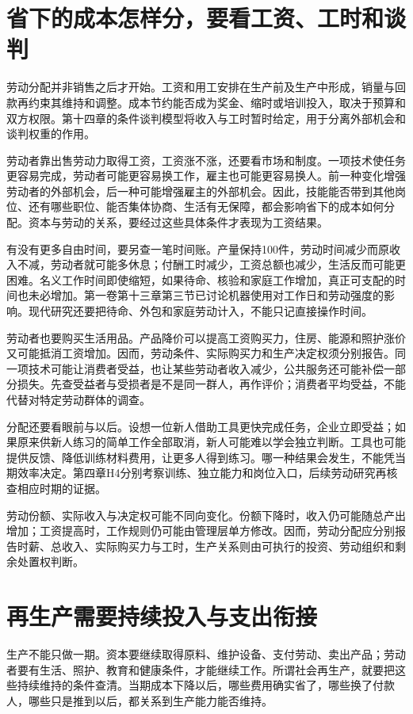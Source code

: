 \documentclass[UTF8,fontset=windows,12pt,a4paper,oneside,openany]{ctexbook}
\begin{document}
\section{省下的成本怎样分，要看工资、工时和谈判}

劳动分配并非销售之后才开始。工资和用工安排在生产前及生产中形成，销量与回款再约束其维持和调整。成本节约能否成为奖金、缩时或培训投入，取决于预算和双方权限。第十四章的条件谈判模型将收入与工时暂时给定，用于分离外部机会和谈判权重的作用。

劳动者靠出售劳动力取得工资，工资涨不涨，还要看市场和制度。一项技术使任务更容易完成，劳动者可能更容易换工作，雇主也可能更容易换人。前一种变化增强劳动者的外部机会，后一种可能增强雇主的外部机会。因此，技能能否带到其他岗位、还有哪些职位、能否集体协商、生活有无保障，都会影响省下的成本如何分配。资本与劳动的关系，要经过这些具体条件才表现为工资结果。

有没有更多自由时间，要另查一笔时间账。产量保持100件，劳动时间减少而原收入不减，劳动者就可能多休息；付酬工时减少，工资总额也减少，生活反而可能更困难。名义工作时间即使缩短，如果待命、核验和家庭工作增加，真正可支配的时间也未必增加。第一卷第十三章第三节已讨论机器使用对工作日和劳动强度的影响。现代研究还要把待命、外包和家庭劳动计入，不能只记直接操作时间。

劳动者也要购买生活用品。产品降价可以提高工资购买力，住房、能源和照护涨价又可能抵消工资增加。因而，劳动条件、实际购买力和生产决定权须分别报告。同一项技术可能让消费者受益，也让某些劳动者收入减少，公共服务还可能补偿一部分损失。先查受益者与受损者是不是同一群人，再作评价；消费者平均受益，不能代替对特定劳动群体的调查。

分配还要看眼前与以后。设想一位新人借助工具更快完成任务，企业立即受益；如果原来供新人练习的简单工作全部取消，新人可能难以学会独立判断。工具也可能提供反馈、降低训练材料费用，让更多人得到练习。哪一种结果会发生，不能凭当期效率决定。第四章H4分别考察训练、独立能力和岗位入口，后续劳动研究再核查相应时期的证据。

劳动份额、实际收入与决定权可能不同向变化。份额下降时，收入仍可能随总产出增加；工资提高时，工作规则仍可能由管理层单方修改。因而，劳动分配应分别报告时薪、总收入、实际购买力与工时，生产关系则由可执行的投资、劳动组织和剩余处置权判断。

\section{再生产需要持续投入与支出衔接}

生产不能只做一期。资本要继续取得原料、维护设备、支付劳动、卖出产品；劳动者要有生活、照护、教育和健康条件，才能继续工作。所谓社会再生产，就要把这些持续维持的条件查清。当期成本下降以后，哪些费用确实省了，哪些换了付款人，哪些只是推到以后，都关系到生产能力能否维持。
\end{document}
